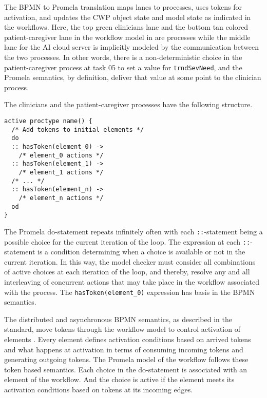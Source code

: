 The BPMN to Promela translation maps lanes to processes, uses tokens for activation, and updates the CWP object state and model state as indicated in the workflows.
Here, the top green clinicians lane and the bottom tan colored patient-caregiver lane in the workflow model in  are processes while the middle lane for the AI cloud server is implicitly modeled by the communication between the two processes.
In other words, there is a non-deterministic choice in the patient-caregiver process at task 05 to set a value for \texttt{trndSevNeed}, and the Promela semantics, by definition, deliver that value at some point to the clinician process.

The clinicians and the patient-caregiver processes have the following structure.
%
{\small
\begin{lstlisting}[style=myPromela]
active proctype name() {
  /* Add tokens to initial elements */
  do
  :: hasToken(element_0) ->
    /* element_0 actions */
  :: hasToken(element_1) ->
    /* element_1 actions */
  /* ... */  
  :: hasToken(element_n) ->
    /* element_n actions */
  od
}
\end{lstlisting}
}
%
\noindent The Promela do-statement repeats infinitely often with each \texttt{::}-statement being a possible choice for the current iteration of the loop.
The expression at each \texttt{::}-statement is a condition determining when a choice is available or not in the current iteration.
In this way, the model checker must consider all combinations of active choices at each iteration of the loop, and thereby, resolve any and all interleaving of concurrent actions that may take place in the workflow associated with the process.
The \texttt{hasToken(element\_0)} expression has basis in the BPMN semantics.

The distributed and asynchronous BPMN semantics, as described in the standard, move tokens through the workflow model to control activation of elements \cite{BPMNSpecification}.
Every element defines activation conditions based on arrived tokens and what happens at activation in terms of consuming incoming tokens and generating outgoing tokens.
The Promela model of the workflow follows these token based semantics.
Each choice in the do-statement is associated with an element of the workflow.
And the choice is active if the element meets its activation conditions based on tokens at its incoming edges.

